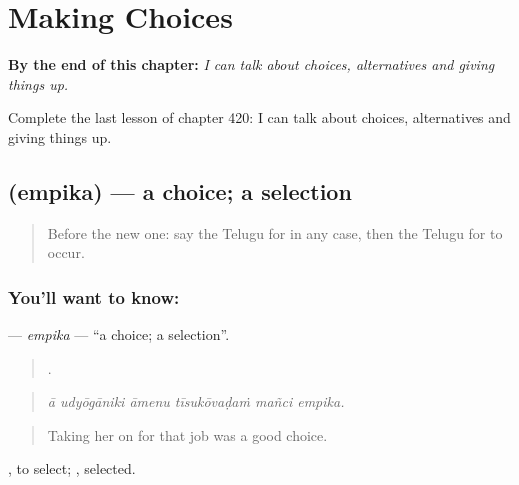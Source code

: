 
\chapter{Making Choices}
\label{ch:te-making-choices}

\begin{chapteropening}
\textbf{By the end of this chapter:} \emph{I can talk about choices, alternatives and giving things up.}

Complete the last lesson of chapter 420: I can talk about choices, alternatives and giving things up.
\end{chapteropening}

\section[\texorpdfstring{\te{ఎంపిక} (empika)}{ఎంపిక (empika)}]{ (empika) — a choice; a selection}

\label{lesson:TE-C420-empika}



\begin{quote}
Before the new one: say the Telugu for in any case, then the Telugu for to occur.
\end{quote}

\subsection*{You'll want to know: }
\textbf{} — \emph{empika} — \textquotedblleft{}a choice; a selection\textquotedblright{}.

\begin{quote}
     .
\end{quote}

\begin{quote}
\emph{ā udyōgāniki āmenu tīsukōvaḍaṁ mañci empika.}
\end{quote}

\begin{quote}
Taking her on for that job was a good choice.
\end{quote}

 , to select; , selected.

